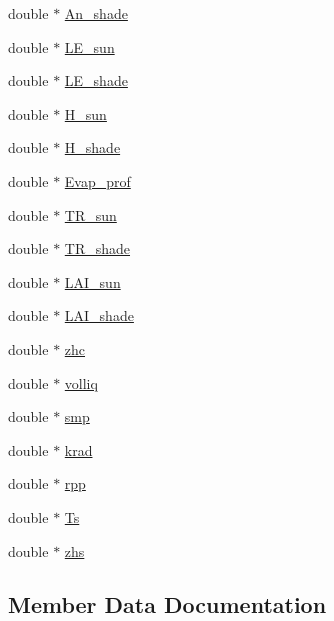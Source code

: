 \begin{DoxyCompactItemize}
double $\ast$ \hyperlink{class_output_class_a9c7918ee34809d8f3c20d0c391ed79e5}{An\+\_\+shade}
\item 
double $\ast$ \hyperlink{class_output_class_a1482ebe07e3734fcb0e4150f4bd55d43}{L\+E\+\_\+sun}
\item 
double $\ast$ \hyperlink{class_output_class_ad6c6279732ece91506a6eca50dd920e9}{L\+E\+\_\+shade}
\item 
double $\ast$ \hyperlink{class_output_class_a22a6b7555e86493bd9b4e5a3f7cea6f8}{H\+\_\+sun}
\item 
double $\ast$ \hyperlink{class_output_class_a086828a8062aed421e62b080b2389e04}{H\+\_\+shade}
\item 
double $\ast$ \hyperlink{class_output_class_ae75fcb0e43b08a5107bbddabaf50f91b}{Evap\+\_\+prof}
\item 
double $\ast$ \hyperlink{class_output_class_aa44eeab755cc348902d9b4aa04d82cb1}{T\+R\+\_\+sun}
\item 
double $\ast$ \hyperlink{class_output_class_a1f8231b7cfaf652fcb8bc7c86a98f4f3}{T\+R\+\_\+shade}
\item 
double $\ast$ \hyperlink{class_output_class_aeb157833487e55bb057f436df22f3a62}{L\+A\+I\+\_\+sun}
\item 
double $\ast$ \hyperlink{class_output_class_a2906b227dd8db1370f4d2608d31132ad}{L\+A\+I\+\_\+shade}
\item 
double $\ast$ \hyperlink{class_output_class_ac0f6ae6bd67a1bf4c917e0a59e64fe0f}{zhc}
\item 
double $\ast$ \hyperlink{class_output_class_ac3649d135f6f2db24caee7036f18e6b3}{volliq}
\item 
double $\ast$ \hyperlink{class_output_class_aec2e1247ed75187bb5c263de859c7d0b}{smp}
\item 
double $\ast$ \hyperlink{class_output_class_ac1dfcc6dbb1cb58ab00c3361f0a5c9b2}{krad}
\item 
double $\ast$ \hyperlink{class_output_class_a22c4d87ded7eb73ba08ac72fc49b380e}{rpp}
\item 
double $\ast$ \hyperlink{class_output_class_a0bd5c93eb11796d9ad1a67010656363b}{Ts}
\item 
double $\ast$ \hyperlink{class_output_class_a6f9e4e0e887070e678b95a58fd278ef8}{zhs}
\end{DoxyCompactItemize}


\subsection{Member Data Documentation}
